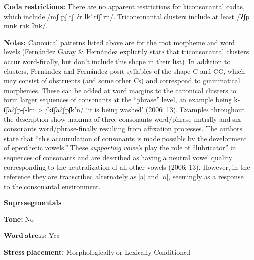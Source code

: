 \documentclass[output=paper]{langsci/langscibook}
\begin{document}
\begin{styleBody}
\textbf{Coda} \textbf{restrictions:} There are no apparent restrictions for biconsonantal codas, which include /mʃ pʃ tʃ ʔr lk' rt͡ʃ rn/. Triconsonantal clusters include at least /ʔʃp mnk rnk ʔnk/.
\end{styleBody}

\begin{styleBody}
\textbf{Notes:} Canonical patterns listed above are for the root morpheme and word levels (Fernández Garay \& Hernández explicitly state that triconsonantal clusters occur word-finally, but don’t include this shape in their list). In addition to clusters, Fernández \citet{Garay1998} and Fernández \citet{GarayHernández2006} posit syllables of the shape C and CC, which may consist of obstruents (and some other Cs) and correspond to grammatical morphemes. These can be added at word margins to the canonical clusters to form larger sequences of consonants at the “phrase” level, an example being k{}-t͡ʃaʔʃp{}-ʃ{}-kn > /kt͡ʃaʔʃpʃk’n/ ‘it is being washed’ (2006: 13). Examples throughout the description show maxima of three consonants word/phrase-initially and six consonants word/phrase-finally resulting from affixation processes. The authors state that “this accumulation of consonants is made possible by the development of epenthetic vowels.” These \textit{supporting} \textit{vowels} play the role of “lubricator” in sequences of consonants and are described as having a neutral vowel quality corresponding to the neutralization of all other vowels (2006: 13). However, in the  reference they are transcribed alternately as [ə] and [ʊ], seemingly as a response to the consonantal environment.
\end{styleBody}

\begin{styleBody}
\textbf{Suprasegmentals}
\end{styleBody}

\begin{styleBody}
\textbf{Tone:} No
\end{styleBody}

\begin{styleBody}
\textbf{Word} \textbf{stress:} Yes
\end{styleBody}

\begin{styleBody}
\textbf{Stress} \textbf{placement:} Morphologically or Lexically Conditioned
\end{styleBody}
\end{document}
